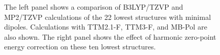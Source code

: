 \begin{figure}[t]
\begin{center}
\end{center}
\begin{spacing}{1.0}
\caption[The left panel shows a comparison of B3LYP/TZVP and MP2/TZVP calculations of the 22 lowest  structures with minimal dipoles. Calculations with TTM2.1-F, TTM3-F, and MB-Pol are also shown. The right panel shows the effect of harmonic zero-point energy correction on these ten lowest structures.]{The left panel shows a comparison of B3LYP/TZVP and MP2/TZVP calculations of the 22 lowest  structures with minimal dipoles. Calculations with TTM2.1-F, TTM3-F, and MB-Pol are also shown. The right panel shows the effect of harmonic zero-point energy correction on these ten lowest structures.}\label{fig:MBE_III_F6}
\end{spacing}
\end{figure}